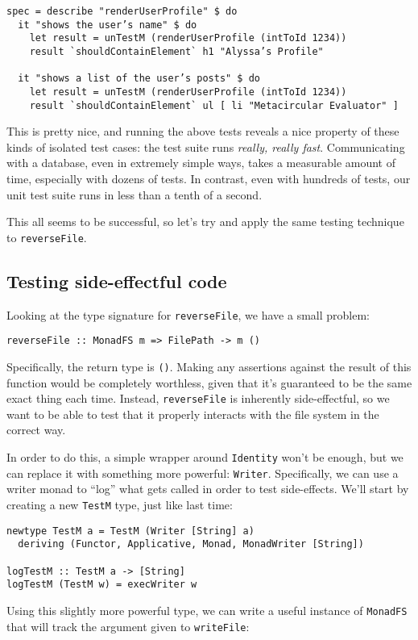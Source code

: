 \begin{verbatim}
spec = describe "renderUserProfile" $ do
  it "shows the user’s name" $ do
    let result = unTestM (renderUserProfile (intToId 1234))
    result `shouldContainElement` h1 "Alyssa’s Profile"

  it "shows a list of the user’s posts" $ do
    let result = unTestM (renderUserProfile (intToId 1234))
    result `shouldContainElement` ul [ li "Metacircular Evaluator" ]
\end{verbatim}
This is pretty nice, and running the above tests reveals a nice property
of these kinds of isolated test cases: the test suite runs \emph{really,
really fast}. Communicating with a database, even in extremely simple
ways, takes a measurable amount of time, especially with dozens of
tests. In contrast, even with hundreds of tests, our unit test suite
runs in less than a tenth of a second.

This all seems to be successful, so let's try and apply the same testing
technique to \texttt{reverseFile}.

\subsection{Testing side-effectful
code}\label{testing-side-effectful-code}

Looking at the type signature for \texttt{reverseFile}, we have a small
problem:

\begin{verbatim}
reverseFile :: MonadFS m => FilePath -> m ()
\end{verbatim}
Specifically, the return type is \texttt{()}. Making any assertions
against the result of this function would be completely worthless, given
that it's guaranteed to be the same exact thing each time. Instead,
\texttt{reverseFile} is inherently side-effectful, so we want to be able
to test that it properly interacts with the file system in the correct
way.

In order to do this, a simple wrapper around \texttt{Identity} won't be
enough, but we can replace it with something more powerful:
\texttt{Writer}. Specifically, we can use a writer monad to ``log'' what
gets called in order to test side-effects. We'll start by creating a new
\texttt{TestM} type, just like last time:

\begin{verbatim}
newtype TestM a = TestM (Writer [String] a)
  deriving (Functor, Applicative, Monad, MonadWriter [String])

logTestM :: TestM a -> [String]
logTestM (TestM w) = execWriter w
\end{verbatim}
Using this slightly more powerful type, we can write a useful instance
of \texttt{MonadFS} that will track the argument given to
\texttt{writeFile}:

